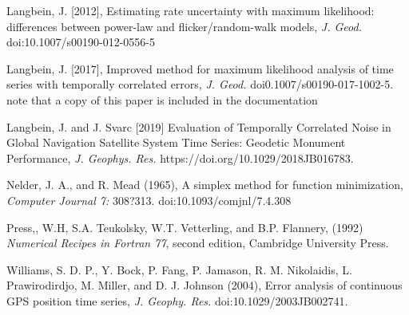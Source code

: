 \documentclass[12pt]{amsart}
\begin{document}
Langbein, J. [2012], Estimating rate uncertainty with maximum likelihood: differences between power-law and flicker/random-walk 
models, \textit{J. Geod.} doi:{10.1007/s00190-012-0556-5}

Langbein, J. [2017], Improved method for maximum likelihood analysis of time series with temporally correlated errors,
\textit{J. Geod.} doi{0.1007/s00190-017-1002-5}.  note that a copy of this paper is included in the documentation

Langbein, J. and J. Svarc [2019] Evaluation of Temporally Correlated Noise in Global Navigation Satellite System Time Series: Geodetic Monument Performance, \textit{J. Geophys. Res.}  https://doi.org/10.1029/2018JB016783.

Nelder, J. A., and R. Mead (1965), A simplex method for function minimization, \textit{Computer Journal 7:} 308?313. doi:10.1093/comjnl/7.4.308

Press,, W.H, S.A. Teukolsky, W.T. Vetterling, and B.P. Flannery, (1992) \textit{Numerical Recipes in Fortran 77}, second edition,
Cambridge University Press.

Williams, S. D. P., Y. Bock, P. Fang, P. Jamason, R. M. Nikolaidis,
L. Prawirodirdjo, M. Miller, and D. J. Johnson (2004), Error analysis of continuous GPS position time series, 
 \textit{J.  Geophy. Res.}  doi:{10.1029/2003JB002741}.
\end{document}
